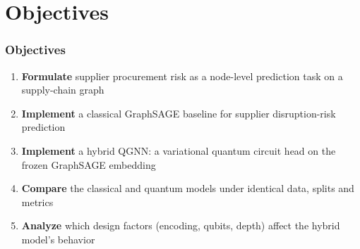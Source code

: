 \documentclass{beamer}
\newcommand{\bodyfont}{\small}
\begin{document}
\section[Objectives]{Objectives}
\begin{frame}
\frametitle{Objectives}
\bodyfont
\begin{enumerate}
  \item \textbf{Formulate} supplier procurement risk as a node-level
        prediction task on a supply-chain graph
  \vspace{0.6em}
  \item \textbf{Implement} a classical GraphSAGE baseline for supplier
        disruption-risk prediction
  \vspace{0.6em}
  \item \textbf{Implement} a hybrid QGNN: a variational quantum circuit head
        on the frozen GraphSAGE embedding
  \vspace{0.6em}
  \item \textbf{Compare} the classical and quantum models under identical
        data, splits and metrics
  \vspace{0.6em}
  \item \textbf{Analyze} which design factors (encoding, qubits, depth)
        affect the hybrid model's behavior
\end{enumerate}
\end{frame}
\end{document}
